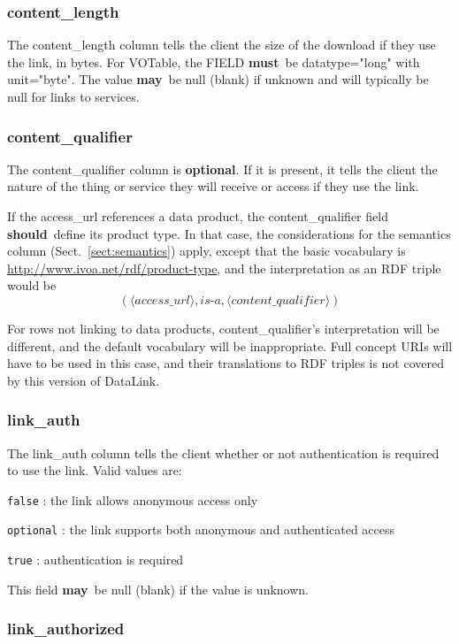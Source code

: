 \documentclass[11pt,a4paper]{ivoa}
\newcommand{\attval}[2]{#1={\allowbreak}{"}#2{"}}
\newcommand{\rfcmust}{\textbf{must}}
\newcommand{\rfcshould}{\textbf{should}}
\newcommand{\rfcmay}{\textbf{may}}
\newcommand{\rfcoptional}{\textbf{optional}}
\begin{document}
\subsubsection{content\_length}

The content\_length column tells the client the size of the download
if they use the link, in bytes. For VOTable, the FIELD \rfcmust\ be
\attval{datatype}{long} with \attval{unit}{byte}.
The value \rfcmay\ be null (blank)
if unknown and will typically be null for links to services.

\subsubsection{content\_qualifier}

The content\_qualifier column is \rfcoptional. If it is present, it tells 
the client the nature of the thing or service they will receive or access 
if they use the link. 

If the access\_url references a data product, the content\_qualifier
field \rfcshould\ define its product type.  In that case, the considerations
for the semantics column (Sect.~\ref{sect:semantics}) apply, except that
the basic vocabulary is \url{http://www.ivoa.net/rdf/product-type}, and
the interpretation as an RDF triple would be $$(
\langle\textit{access\_url}\rangle, \textit{is-a},
\langle\textit{content\_qualifier}\rangle)$$

For rows not linking to data products, content\_qualifier's
interpretation will be different, and the default vocabulary will be
inappropriate.  Full concept URIs will have to be used in this case, and
their translations to RDF triples is not covered by this version of
DataLink.

\subsubsection{link\_auth}

The link\_auth column tells the client whether or not authentication is required 
to use the link. Valid values are:

\verb|false| : the link allows anonymous access only

\verb|optional| : the link supports both anonymous and authenticated access

\verb|true| : authentication is required

This field \rfcmay\ be null (blank) if the value is unknown.

\subsubsection{link\_authorized}
\end{document}
